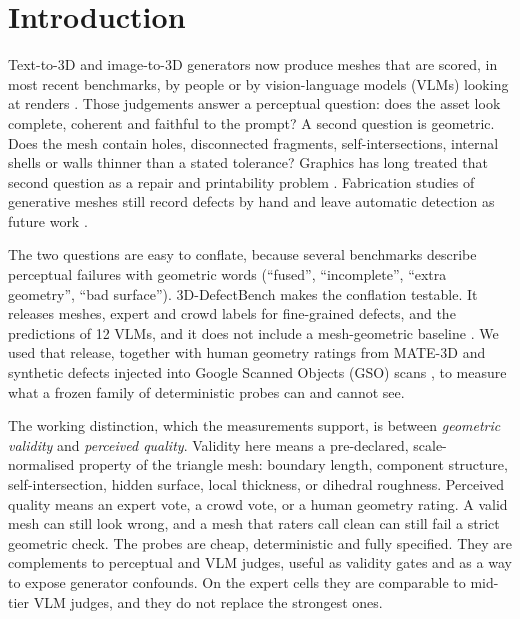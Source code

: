 \section{Introduction}
\label{sec:intro}

Text-to-3D and image-to-3D generators now produce meshes that are scored, in most recent benchmarks, by people or by vision-language models (VLMs) looking at renders \citep{poole2022dreamfusion,lin2023magic3d,wu2024gpteval3d,zhang2025mate3d,zhao2026defectbench,zhang2025hi3deval}.
Those judgements answer a perceptual question: does the asset look complete, coherent and faithful to the prompt?
A second question is geometric.
Does the mesh contain holes, disconnected fragments, self-intersections, internal shells or walls thinner than a stated tolerance?
Graphics has long treated that second question as a repair and printability problem \citep{attene2010meshfix,zhou2016thingi10k,garland1997qem}.
Fabrication studies of generative meshes still record defects by hand and leave automatic detection as future work \citep{faruqi2026instructmesh}.

The two questions are easy to conflate, because several benchmarks describe perceptual failures with geometric words (``fused'', ``incomplete'', ``extra geometry'', ``bad surface'').
3D-DefectBench makes the conflation testable.
It releases meshes, expert and crowd labels for fine-grained defects, and the predictions of 12 VLMs, and it does not include a mesh-geometric baseline \citep{zhao2026defectbench}.
We used that release, together with human geometry ratings from MATE-3D \citep{zhang2025mate3d} and synthetic defects injected into Google Scanned Objects (GSO) scans \citep{downs2022gso}, to measure what a frozen family of deterministic probes can and cannot see.

The working distinction, which the measurements support, is between \emph{geometric validity} and \emph{perceived quality}.
Validity here means a pre-declared, scale-normalised property of the triangle mesh: boundary length, component structure, self-intersection, hidden surface, local thickness, or dihedral roughness.
Perceived quality means an expert vote, a crowd vote, or a human geometry rating.
A valid mesh can still look wrong, and a mesh that raters call clean can still fail a strict geometric check.
The probes are cheap, deterministic and fully specified.
They are complements to perceptual and VLM judges, useful as validity gates and as a way to expose generator confounds.
On the expert cells they are comparable to mid-tier VLM judges, and they do not replace the strongest ones.

